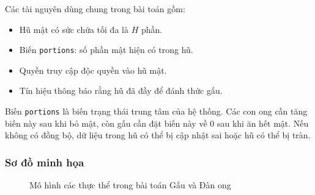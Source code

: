 Các tài nguyên dùng chung trong bài toán gồm:

\begin{itemize}
\item Hũ mật có sức chứa tối đa là $H$ phần.
\item Biến \texttt{portions}: số phần mật hiện có trong hũ.
\item Quyền truy cập độc quyền vào hũ mật.
\item Tín hiệu thông báo rằng hũ đã đầy để đánh thức gấu.
\end{itemize}

Biến \texttt{portions} là biến trạng thái trung tâm của hệ thống. Các
con ong cần tăng biến này sau khi bỏ mật, còn gấu cần đặt biến này về 0
sau khi ăn hết mật. Nếu không có đồng bộ, dữ liệu trong hũ có thể bị
cập nhật sai hoặc hũ có thể bị tràn.

\subsubsection*{Sơ đồ minh họa}

\begin{figure}[H]
\centering
{}
\caption{Mô hình các thực thể trong bài toán Gấu và Đàn ong}
\label{fig:bear-honeybees-model}

\end{figure}

